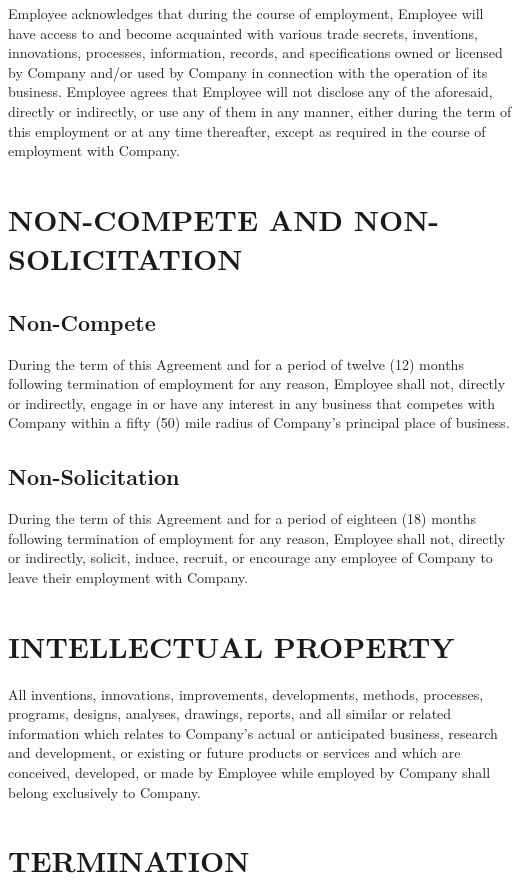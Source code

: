 \documentclass[12pt,letterpaper]{article}
\begin{document}
Employee acknowledges that during the course of employment, Employee will have access to and become acquainted with various trade secrets, inventions, innovations, processes, information, records, and specifications owned or licensed by Company and/or used by Company in connection with the operation of its business. Employee agrees that Employee will not disclose any of the aforesaid, directly or indirectly, or use any of them in any manner, either during the term of this employment or at any time thereafter, except as required in the course of employment with Company.

\section{NON-COMPETE AND NON-SOLICITATION}

\subsection{Non-Compete}
During the term of this Agreement and for a period of twelve (12) months following termination of employment for any reason, Employee shall not, directly or indirectly, engage in or have any interest in any business that competes with Company within a fifty (50) mile radius of Company's principal place of business.

\subsection{Non-Solicitation}
During the term of this Agreement and for a period of eighteen (18) months following termination of employment for any reason, Employee shall not, directly or indirectly, solicit, induce, recruit, or encourage any employee of Company to leave their employment with Company.

\section{INTELLECTUAL PROPERTY}

All inventions, innovations, improvements, developments, methods, processes, programs, designs, analyses, drawings, reports, and all similar or related information which relates to Company's actual or anticipated business, research and development, or existing or future products or services and which are conceived, developed, or made by Employee while employed by Company shall belong exclusively to Company.

\section{TERMINATION}
\end{document}
